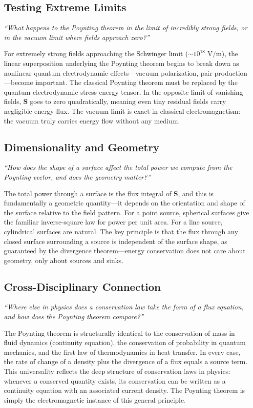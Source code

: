 \documentclass[11pt,openright]{book}
\begin{document}
\subsection*{Testing Extreme Limits}
\textit{``What happens to the Poynting theorem in the limit of incredibly strong fields, or in the vacuum limit where fields approach zero?''}

For extremely strong fields approaching the Schwinger limit ($\sim 10^{18}$ V/m), the linear superposition underlying the Poynting theorem begins to break down as nonlinear quantum electrodynamic effects---vacuum polarization, pair production---become important. The classical Poynting theorem must be replaced by the quantum electrodynamic stress-energy tensor. In the opposite limit of vanishing fields, $\mathbf{S}$ goes to zero quadratically, meaning even tiny residual fields carry negligible energy flux. The vacuum limit is exact in classical electromagnetism: the vacuum truly carries energy flow without any medium.

\subsection*{Dimensionality and Geometry}
\textit{``How does the shape of a surface affect the total power we compute from the Poynting vector, and does the geometry matter?''}

The total power through a surface is the flux integral of $\mathbf{S}$, and this is fundamentally a geometric quantity---it depends on the orientation and shape of the surface relative to the field pattern. For a point source, spherical surfaces give the familiar inverse-square law for power per unit area. For a line source, cylindrical surfaces are natural. The key principle is that the flux through any closed surface surrounding a source is independent of the surface shape, as guaranteed by the divergence theorem---energy conservation does not care about geometry, only about sources and sinks.

\subsection*{Cross-Disciplinary Connection}
\textit{``Where else in physics does a conservation law take the form of a flux equation, and how does the Poynting theorem compare?''}

The Poynting theorem is structurally identical to the conservation of mass in fluid dynamics (continuity equation), the conservation of probability in quantum mechanics, and the first law of thermodynamics in heat transfer. In every case, the rate of change of a density plus the divergence of a flux equals a source term. This universality reflects the deep structure of conservation laws in physics: whenever a conserved quantity exists, its conservation can be written as a continuity equation with an associated current density. The Poynting theorem is simply the electromagnetic instance of this general principle.
\end{document}
